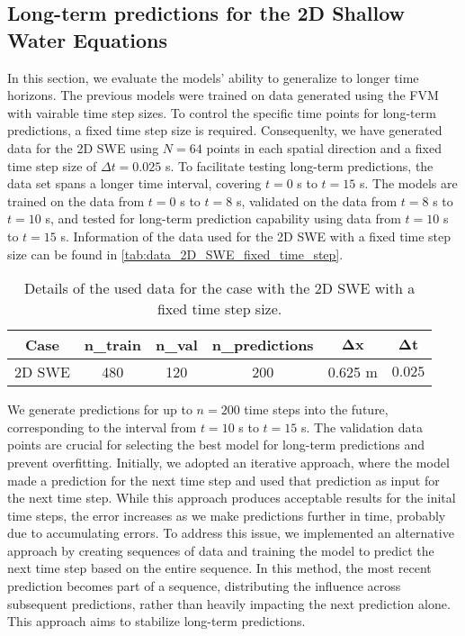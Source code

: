 \subsection{Long-term predictions for the 2D Shallow Water Equations}
In this section, we evaluate the models' ability to generalize to longer time horizons.
The previous models were trained on data generated using the FVM with vairable time step sizes.
To control the specific time points for long-term predictions, a fixed time step size is required.
Consequenlty, we have generated data for the 2D SWE using $N = 64$ points in each spatial direction and a fixed time step size of $\Delta t = 0.025$ s.
To facilitate testing long-term predictions, the data set spans a longer time interval, covering $t = 0$ s to $t = 15$ s.
The models are trained on the data from $t = 0$ s to $t = 8$ s, validated on the data from $t = 8$ s to $t = 10$ s, and tested for long-term prediction capability using data from $t = 10$ s to $t = 15$ s.
Information of the data used for the 2D SWE with a fixed time step size can be found in \autoref{tab:data_2D_SWE_fixed_time_step}.
\begin{table}[H]
    \centering
    \begin{tabular}{c|ccccc}
        \textbf{Case} & \textbf{n\_train} & \textbf{n\_val} & \textbf{n\_predictions} & $\mathbf{\Delta x}$ & $\mathbf{\Delta t}$ \\
        \hline
        2D SWE & 480 & 120 & 200 & 0.625 m  & $0.025$ \\
    \end{tabular}
    \caption{Details of the used data for the case with the 2D SWE with a fixed time step size.}\label{tab:data_2D_SWE_fixed_time_step}
\end{table}
We generate predictions for up to $n = 200$ time steps into the future, corresponding to the interval from $t = 10$ s to $t = 15$ s.
The validation data points are crucial for selecting the best model for long-term predictions and prevent overfitting.
Initially, we adopted an iterative approach, where the model made a prediction for the next time step and used that prediction as input for the next time step.
While this approach produces acceptable results for the inital time steps, the error increases as we make predictions further in time, probably due to accumulating errors.
To address this issue, we implemented an alternative approach by creating sequences of data and training the model to predict the next time step based on the entire sequence.
In this method, the most recent prediction becomes part of a sequence, distributing the influence across subsequent predictions, rather than heavily impacting the next prediction alone.
This approach aims to stabilize long-term predictions.

